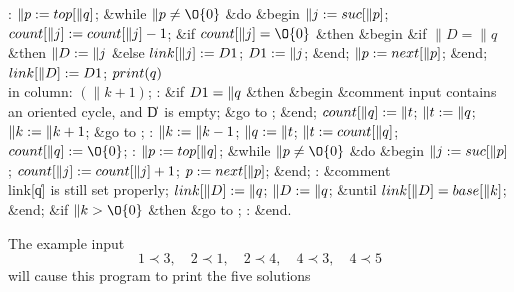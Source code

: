 \0:\6
$\|p\mathrel{:=} \\{top}[\|q]$;\6
\&{while} $\|p \ne \O{0}$ \1\&{do}\6
\&{begin}\1
$\|j\mathrel{:=} \\{suc}[\|p]$; \5
$\\{count}[\|j]\mathrel{:=} \\{count}[\|j]-1$;\6
\&{if} $\\{count}[\|j] = \O{0}$ \1\&{then}\6
\&{begin} \&{if} $\|D = \|q$ \1\&{then} $\|D\mathrel{:=} \|j$ \&{else} $\\{link}[\|j] \mathrel{:=} \\{D1}$;\5
$\\{D1} \mathrel{:=} \|j$;\6
\4\&{end};\2\6
$\|p\mathrel{:=} \\{next}[\|p]$;\6
\4\&{end};\2\2\6
$\\{link} [\|D] \mathrel{:=} \\{D1}$;\6
$\\{print}(q)$ \\{in column}: $(\|k+1)$;\6
\0:\6
\&{if} $\\{D1} = \|q$ \1\&{then}\6
\&{begin}\1
\&{comment} input contains an oriented cycle, and \|D~is empty;\6
\&{go to} ;\6
\4\&{end};\2\2\6
$\\{count}[\|q] \mathrel{:=} \|t$; \5
$\|t\mathrel{:=} \|q$;\6
$\|k\mathrel{:=} \|k+1$; \5
\&{go to} ;\6
\0:
$\|k\mathrel{:=} \|k-1$;\6
$\|q\mathrel{:=} \|t$; \5
$\|t\mathrel{:=} \\{count}[\|q]$; \5
$\\{count}[\|q] \K \O{0}$;\6
\0:\6
$\|p\mathrel{:=} \\{top}[\|q]$;\6
\&{while} $\|p \ne \O{0}$ \1\&{do}\6
\&{begin}
$\|j\mathrel{:=} \\{suc}[\|p]$; \5
$\\{count}[\|j]\mathrel{:=} \\{count}[\|j]+1$; \5
$p\mathrel{:=} \\{next}[\|p]$;\6
\&{end};\2\6
\0:
\&{comment} \\{link}[\|q] is still set properly;\6
$\\{link}[\|D] \mathrel{:=} \|q$; \5
$\|D\mathrel{:=} \|q$;\6
\4\&{until}
$\\{link}[\|D] = \\{base}[\|k]$;\2\6
\4\&{end};\2\2\6
\&{if} $\|k > \O{0}$ \&{then} \&{go to} ;\6
\4: \&{end}.\2\6
\Q


The example input $$1\prec 3{,\quad} 2\prec 1{,\quad} 2\prec 4{,\quad} 4\prec 3{,\quad} 4\prec 5$$ will cause this program to print the five solutions

